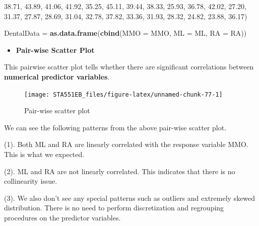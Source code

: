 \documentclass[
]{book}
\newenvironment{Shaded}{\begin{snugshade}}{\end{snugshade}}
\newcommand{\AttributeTok}[1]{\textcolor[rgb]{0.13,0.29,0.53}{#1}}
\newcommand{\FloatTok}[1]{\textcolor[rgb]{0.00,0.00,0.81}{#1}}
\newcommand{\FunctionTok}[1]{\textcolor[rgb]{0.13,0.29,0.53}{\textbf{#1}}}
\newcommand{\NormalTok}[1]{#1}
\newcommand{\OtherTok}[1]{\textcolor[rgb]{0.56,0.35,0.01}{#1}}
\providecommand{\tightlist}{%
  \setlength{\itemsep}{0pt}\setlength{\parskip}{0pt}}
\begin{document}
\begin{Shaded}
\begin{Highlighting}[]
       \FloatTok{38.71}\NormalTok{, }\FloatTok{43.89}\NormalTok{, }\FloatTok{41.06}\NormalTok{, }\FloatTok{41.92}\NormalTok{, }\FloatTok{35.25}\NormalTok{, }\FloatTok{45.11}\NormalTok{, }\FloatTok{39.44}\NormalTok{, }\FloatTok{38.33}\NormalTok{, }\FloatTok{25.93}\NormalTok{, }\FloatTok{36.78}\NormalTok{, }\FloatTok{42.02}\NormalTok{, }
       \FloatTok{27.20}\NormalTok{, }\FloatTok{31.37}\NormalTok{, }\FloatTok{27.87}\NormalTok{, }\FloatTok{28.69}\NormalTok{, }\FloatTok{31.04}\NormalTok{, }\FloatTok{32.78}\NormalTok{, }\FloatTok{37.82}\NormalTok{, }\FloatTok{33.36}\NormalTok{, }\FloatTok{31.93}\NormalTok{, }\FloatTok{28.32}\NormalTok{, }\FloatTok{24.82}\NormalTok{, }
       \FloatTok{23.88}\NormalTok{, }\FloatTok{36.17}\NormalTok{)}

\NormalTok{DentalData }\OtherTok{=} \FunctionTok{as.data.frame}\NormalTok{(}\FunctionTok{cbind}\NormalTok{(}\AttributeTok{MMO =}\NormalTok{ MMO, }\AttributeTok{ML =}\NormalTok{ ML, }\AttributeTok{RA =}\NormalTok{ RA))}
\end{Highlighting}
\end{Shaded}

\begin{itemize}
\tightlist
\item
  \textbf{Pair-wise Scatter Plot}
\end{itemize}

This pairwise scatter plot tells whether there are significant correlations between \textbf{numerical predictor variables}.

\begin{figure}[!ht]

{\centering \texttt{[image: STA551EB\_files/figure-latex/unnamed-chunk-77-1]} 

}

\caption{Pair-wise scatter plot}\label{fig:unnamed-chunk-77}
\end{figure}

We can see the following patterns from the above pair-wise scatter plot.

(1). Both ML and RA are linearly correlated with the response variable MMO. This is what we expected.

(2). ML and RA are not linearly correlated. This indicates that there is no collinearity issue.

(3). We also don't see any special patterns such as outliers and extremely skewed distribution. There is no need to perform discretization and regrouping procedures on the predictor variables.
\end{document}
